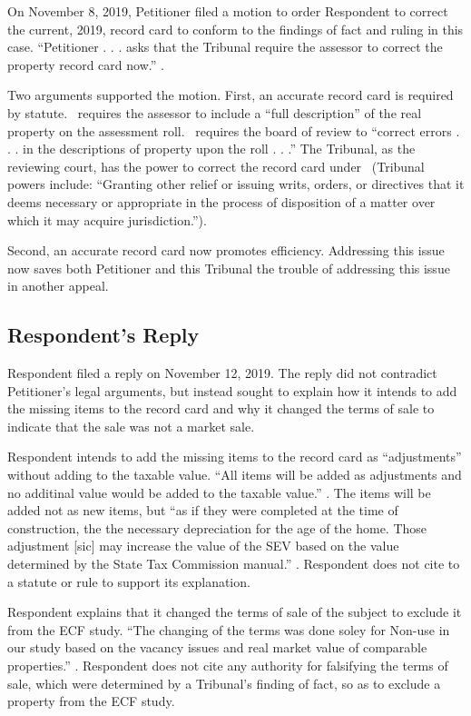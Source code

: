 \documentclass[12pt,\documentclassflag]{michiganCourtOfAppealsBrief}
\begin{document}
On November 8, 2019, Petitioner filed a motion to order Respondent to correct the current, 2019, record card to conform to the findings of fact and ruling in this case. ``Petitioner . . . asks that the Tribunal require
the assessor to correct the property record card now.'' . 

Two arguments supported the motion. First, an accurate record card is required by statute. \cite{MCL 211.24(1)}\ requires the assessor to include a ``full description'' of the real property on the assessment roll. \cite{MCL 211.29(2)}\ requires the board of review to ``correct errors . . . in the descriptions of property upon the roll . . .'' The Tribunal, as the reviewing court, has the power to correct the record card under \cite{MCL 205.732(c)}\ (Tribunal powers include: ``Granting other relief or issuing writs, orders, or directives that it deems necessary or appropriate in the process of disposition of a matter over which it may acquire jurisdiction.'').

Second, an accurate record card now promotes efficiency. Addressing this issue now saves both Petitioner and this Tribunal the trouble of addressing this issue in another appeal.

\subsection{Respondent's Reply}

Respondent filed a reply on November 12, 2019. The reply did not contradict Petitioner's legal arguments, but instead sought to explain how it intends to add the missing items to the record card and why it changed the terms of sale to indicate that the sale was not a market sale.

Respondent intends to add the missing items to the record card as ``adjustments'' without adding to the taxable value. ``All items will be added as adjustments and no additinal value would be added to the taxable value.'' . The items will be added not as new items, but ``as if they were completed at the time of construction, the the necessary depreciation for the age of the home. Those adjustment [sic] may increase the value of the SEV based on the value determined by the State Tax Commission manual.'' . Respondent does not cite to a statute or rule to support its explanation.

Respondent explains that it changed the terms of sale of the subject to exclude it from the ECF study. ``The changing of the terms was done soley for Non-use in our study based on the vacancy issues and real market value of comparable properties.'' . Respondent does not cite any authority for falsifying the terms of sale, which were determined by a Tribunal's finding of fact, so as to exclude a property from the ECF study. 
\end{document}
